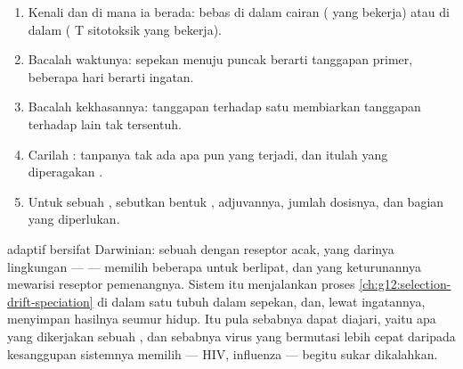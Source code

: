 \begin{method}\label{met:g12:adaptive-immunity:read}
\begin{enumerate}
  \item Kenali  dan di mana ia berada: bebas di dalam cairan
        ( yang bekerja) atau di dalam  ( T sitotoksik
        yang bekerja).
  \item Bacalah waktunya: sepekan menuju puncak berarti tanggapan
        primer, beberapa hari berarti ingatan.
  \item Bacalah kekhasannya: tanggapan terhadap satu 
        membiarkan tanggapan terhadap  lain tak tersentuh.
  \item Carilah : tanpanya tak ada apa pun yang
        terjadi, dan itulah yang diperagakan .
  \item Untuk sebuah , sebutkan bentuk , adjuvannya,
        jumlah dosisnya, dan bagian  yang diperlukan.
\end{enumerate}
\end{method}

\begin{remark}\label{rem:g12:adaptive-immunity:selection}
 adaptif bersifat Darwinian: sebuah   dengan
reseptor acak, yang darinya lingkungan ---  --- memilih
beberapa untuk berlipat, dan yang keturunannya mewarisi reseptor
pemenangnya. Sistem itu menjalankan proses
\cref{ch:g12:selection-drift-speciation} di dalam satu tubuh dalam
sepekan, dan, lewat ingatannya, menyimpan hasilnya seumur hidup. Itu
pula sebabnya  dapat diajari, yaitu apa yang dikerjakan
sebuah , dan sebabnya virus yang bermutasi lebih cepat daripada
kesanggupan sistemnya memilih --- HIV, influenza --- begitu sukar
dikalahkan.
\end{remark}

